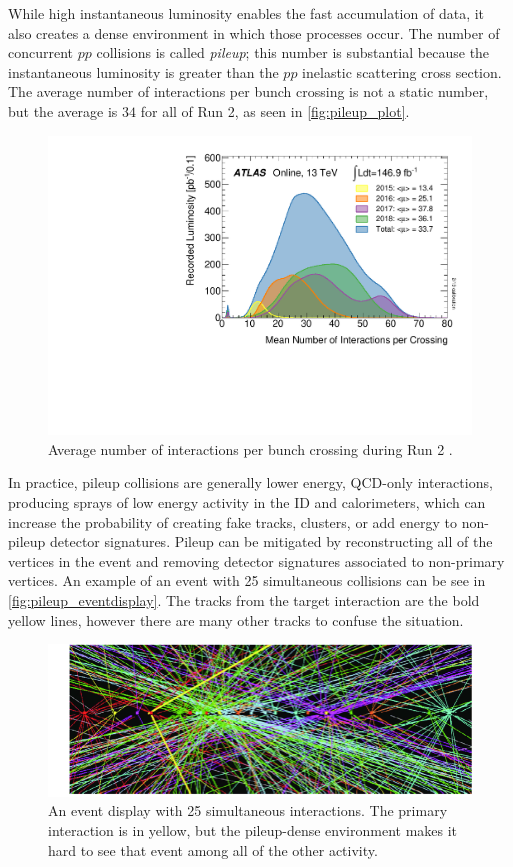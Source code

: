 While high instantaneous luminosity enables the fast accumulation of data, it also creates a dense environment in which those processes occur. The number of concurrent $pp$ collisions is called \emph{pileup}; this number is substantial because the instantaneous luminosity is greater than the $pp$ inelastic scattering cross section. The average number of interactions per bunch crossing is not a static number, but the average is $34$ for all of Run 2, as seen in \autoref{fig:pileup_plot}.

\begin{figure}[h!]
\centering
\includegraphics[width=.6\textwidth]{figures/Detector/lhc-mu.pdf}
\caption{Average number of interactions per bunch crossing during Run 2 \cite{lumi-public}.}
\label{fig:pileup_plot}
\end{figure}

In practice, pileup collisions are generally lower energy, \ac{QCD}-only interactions, producing sprays of low energy activity in the \ac{ID} and calorimeters, which can increase the probability of  creating fake tracks, clusters, or add energy to non-pileup detector signatures.  Pileup can be mitigated by reconstructing all of the vertices in the event and removing detector signatures associated to non-primary vertices. An example of an event with 25 simultaneous collisions can be see in \autoref{fig:pileup_eventdisplay}. The tracks from the target interaction are the bold yellow lines, however there are many other tracks to confuse the situation.


\begin{figure}[htbp]
\centering
\includegraphics[width=.6\textwidth]{figures/Detector/lhc-pileup-eventdisplay.png}
\caption{An event display with 25 simultaneous interactions. The primary interaction is in yellow, but the pileup-dense environment makes it hard to see that event among all of the other activity. \cite{eventdisplays-public}}
\label{fig:pileup_eventdisplay}
\end{figure}




